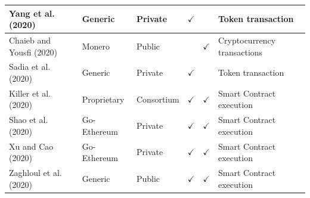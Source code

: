 \documentclass[../access.tex]{subfiles}
\begin{document}
\begin{table}[htbp]
\begin{adjustwidth}{-1cm}{}
\begin{tabular}{m{4.4cm} >{\centering\arraybackslash}m{2.9cm} >{\centering\arraybackslash}m{1.0cm} >{\centering\arraybackslash}m{1.0cm} >{\centering\arraybackslash}m{1.5cm} >{\centering\arraybackslash}m{3.6cm}}
            \hline
            \footnotesize{Yang et al. (2020) \cite{Yang2020}}              & \footnotesize{Generic}                         & \footnotesize{Private}                           & $ \checkmark $                                         & {}                                                    & \footnotesize{Token transaction}           \\
            \hline
            \footnotesize{Chaieb and Yousfi (2020) \cite{Chaieb2020}}      & \footnotesize{Monero}                          & \footnotesize{Public}                            & {}                                                     & $ \checkmark $                                        & \footnotesize{Cryptocurrency transactions} \\
            \hline
            \footnotesize{Sadia et al. (2020) \cite{Sadia2020}}            & \footnotesize{Generic}                         & \footnotesize{Private}                           & $ \checkmark $                                         & {}                                                    & \footnotesize{Token transaction}           \\
            \hline
            \footnotesize{Killer et al. (2020) \cite{Killer2020}}          & \footnotesize{Proprietary}                     & \footnotesize{Consortium}                        & $ \checkmark $                                         & $ \checkmark $                                        & \footnotesize{Smart Contract execution}    \\
            \hline
            \footnotesize{Shao et al. (2020) \cite{Shao2020}}              & \footnotesize{Go-Ethereum}                     & \footnotesize{Private}                           & $ \checkmark $                                         & $ \checkmark $                                        & \footnotesize{Smart Contract execution}    \\
            \hline
            \footnotesize{Xu and Cao (2020) \cite{Xu2020}}                 & \footnotesize{Go-Ethereum}                     & \footnotesize{Private}                           & $ \checkmark $                                         & $ \checkmark $                                        & \footnotesize{Smart Contract execution}    \\
            \hline
            \footnotesize{Zaghloul et al. (2020) \cite{Zaghloul2020}}      & \footnotesize{Generic}                         & \footnotesize{Public}                            & $ \checkmark $                                         & $ \checkmark $                                        & \footnotesize{Smart Contract execution}    \\

\end{tabular}
\end{adjustwidth}
\end{table}
\end{document}
